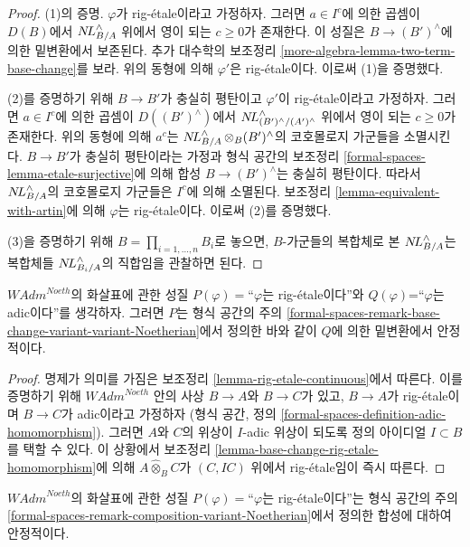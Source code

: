 \begin{proof}
\medskip\noindent
(1)의 증명. $\varphi$가 rig-\'etale이라고 가정하자. 그러면
$a \in I^c$에 의한 곱셈이 $D(B)$에서 $\mathop{N\!L}\nolimits_{B/A}^\wedge$ 위에서
영이 되는 $c \geq 0$가 존재한다. 이 성질은 $B \to (B')^\wedge$에 의한
밑변환에서 보존된다. 추가 대수학의 보조정리
\ref{more-algebra-lemma-two-term-base-change}를 보라.
위의 동형에 의해 $\varphi'$은 rig-\'etale이다. 이로써 (1)을 증명했다.

\medskip\noindent
(2)를 증명하기 위해 $B \to B'$가 충실히 평탄이고 $\varphi'$이
rig-\'etale이라고 가정하자. 그러면 $a \in I^c$에 의한 곱셈이
$D((B')^\wedge)$에서
$\mathop{N\!L}\nolimits_{(B')^\wedge/(A')^\wedge}^\wedge$ 위에서 영이 되는
$c \geq 0$가 존재한다. 위의 동형에 의해 $a^c$는
$\mathop{N\!L}\nolimits_{B/A}^\wedge \otimes_B (B')^\wedge$의 코호몰로지 가군들을 소멸시킨다.
$B \to B'$가 충실히 평탄이라는 가정과 형식 공간의 보조정리
\ref{formal-spaces-lemma-etale-surjective}에 의해 합성
$B \to (B')^\wedge$는 충실히 평탄이다. 따라서
$\mathop{N\!L}\nolimits_{B/A}^\wedge$의 코호몰로지 가군들은 $I^c$에 의해 소멸된다.
보조정리 \ref{lemma-equivalent-with-artin}에 의해
$\varphi$는 rig-\'etale이다. 이로써 (2)를 증명했다.

\medskip\noindent
(3)을 증명하기 위해 $B = \prod_{i = 1, \ldots, n} B_i$로 놓으면,
$B$-가군들의 복합체로 본 $\mathop{N\!L}\nolimits_{B/A}^\wedge$는 복합체들
$\mathop{N\!L}\nolimits_{B_i/A}^\wedge$의 직합임을 관찰하면 된다.
\end{proof}

\begin{lemma}
\label{lemma-base-change-rig-etale-continuous}
$\textit{WAdm}^{Noeth}$의 화살표에 관한 성질
$P(\varphi)=$``$\varphi$는 rig-\'etale이다''와
$Q(\varphi)$=``$\varphi$는 adic이다''를 생각하자.
그러면 $P$는 형식 공간의 주의
\ref{formal-spaces-remark-base-change-variant-variant-Noetherian}에서
정의한 바와 같이 $Q$에 의한 밑변환에서 안정적이다.
\end{lemma}

\begin{proof}
명제가 의미를 가짐은 보조정리 \ref{lemma-rig-etale-continuous}에서 따른다.
이를 증명하기 위해 $\textit{WAdm}^{Noeth}$ 안의 사상
$B \to A$와 $B \to C$가 있고, $B \to A$가 rig-\'etale이며
$B \to C$가 adic이라고 가정하자
(형식 공간, 정의 \ref{formal-spaces-definition-adic-homomorphism}).
그러면 $A$와 $C$의 위상이 $I$-adic 위상이 되도록
정의 아이디얼 $I \subset B$를 택할 수 있다. 이 상황에서 보조정리
\ref{lemma-base-change-rig-etale-homomorphism}에 의해
$A \widehat{\otimes}_B C$가 $(C, IC)$ 위에서 rig-\'etale임이 즉시 따른다.
\end{proof}

\begin{lemma}
\label{lemma-composition-rig-etale-continuous}
$\textit{WAdm}^{Noeth}$의 화살표에 관한 성질
$P(\varphi)=$``$\varphi$는 rig-\'etale이다''는 형식 공간의 주의
\ref{formal-spaces-remark-composition-variant-Noetherian}에서 정의한
합성에 대하여 안정적이다.
\end{lemma}

